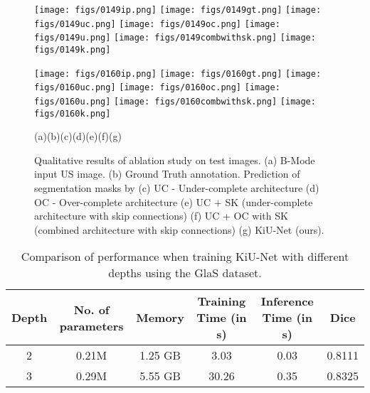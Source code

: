 \documentclass[journal,twoside,web]{ieeecolor}
\begin{document}
\begin{figure*}[ht!]
	\begin{center}
		\centering
		\texttt{[image: figs/0149ip.png]}
		\texttt{[image: figs/0149gt.png]}
		\texttt{[image: figs/0149uc.png]}
		\texttt{[image: figs/0149oc.png]}
		\texttt{[image: figs/0149u.png]}
		\texttt{[image: figs/0149combwithsk.png]}
		\texttt{[image: figs/0149k.png]}
		
		
		
		\vskip4pt
		\texttt{[image: figs/0160ip.png]}
		\texttt{[image: figs/0160gt.png]}
		\texttt{[image: figs/0160uc.png]}
		\texttt{[image: figs/0160oc.png]}
		\texttt{[image: figs/0160u.png]}
		\texttt{[image: figs/0160combwithsk.png]}
		\texttt{[image: figs/0160k.png]}
		
		


		(a)\hskip42pt(b)\hskip42pt(c)\hskip42pt(d)\hskip42pt(e)\hskip42pt(f)\hskip42pt(g)\\
\caption{Qualitative results of ablation study on test images. (a) B-Mode input US image. (b) Ground Truth annotation. Prediction of segmentation masks by (c) UC - Under-complete architecture (d) OC - Over-complete architecture (e) UC + SK (under-complete architecture with skip connections) (f) UC + OC with SK (combined architecture with skip connections) (g) KiU-Net (ours). }
		\label{Fig:abl}
	\end{center}
\end{figure*}
\begin{table*}[htbp]
	\centering
	\caption{Comparison of performance when training KiU-Net with different depths using the GlaS dataset.}
	\begin{tabular}{c|c|c|c|c|c}
		\hline
		Depth                   & No. of parameters  & Memory                & Training Time (in s)         & Inference Time (in s) & Dice \\ \hline
		2                       & 0.21M                 & 1.25 GB                  &  3.03                  & 0.03               & 0.8111         \\ \hline
		3 & 0.29M  & 5.55 GB  & 30.26  & 0.35               &  0.8325       
	\end{tabular}
	
	\label{tab7}
\end{table*}
\end{document}
